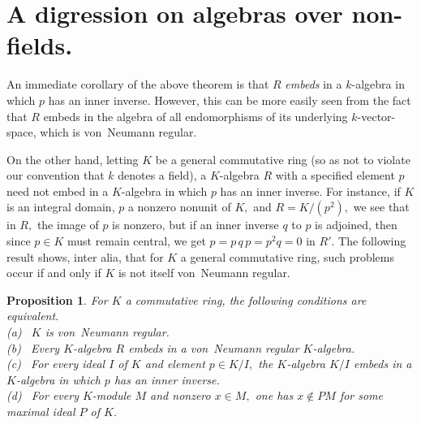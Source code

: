 \documentclass{amsart}
\newtheorem{proposition}[theorem]{Proposition}
\begin{document}
\section{A digression on algebras over non-fields.}\label{S.digress}

An immediate corollary of the above theorem is that
$R$ {\em embeds} in a $\!k\!$-algebra in which $p$ has an inner inverse.
However, this can be more easily seen from the fact that
$R$ embeds in the algebra of all endomorphisms of its underlying
$\!k\!$-vector-space, which is von~Neumann regular.

On the other hand, letting $K$ be a general commutative ring
(so as not to violate our convention that $k$ denotes a field),
a $\!K\!$-algebra $R$ with a specified element $p$
need not embed in a $\!K\!$-algebra in which $p$ has an inner inverse.
For instance, if $K$ is an integral domain,
$p$ a nonzero nonunit of $K,$ and $R=K/(p^2),$
we see that in $R,$ the image of $p$ is nonzero, but if
an inner inverse $q$ to $p$ is adjoined, then since $p\in K$
must remain central, we get $p=p\,q\,p=p^2q=0$ in $R'.$
The following result shows, inter alia,
that for $K$ a general commutative ring, such problems
occur if and only if $K$ is not itself von~Neumann regular.

\begin{proposition}\label{P.KvN}
For $K$ a commutative ring, the following conditions are
equivalent.\\[.5em]
\textup{(a)} \ $K$ is von~Neumann regular.\\[.5em]
\textup{(b)} \ Every $\!K\!$-algebra $R$ embeds in a von~Neumann
regular $\!K\!$-algebra.\\[.5em]
\textup{(c)} \ For every ideal $I$ of $K$ and element $p\in K/I,$
the $\!K\!$-algebra $K/I$ embeds in a $\!K\!$-algebra in which $p$ has
an inner inverse.\\[.5em]
\textup{(d)} \ For every $\!K\!$-module $M$ and nonzero $x\in M,$
one has $x\notin PM$ for some maximal ideal $P$ of $K.$
\end{proposition}
\end{document}
